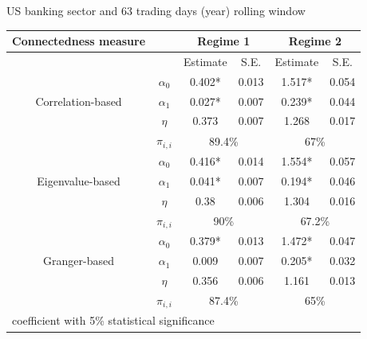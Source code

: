 \documentclass{beamer}
\begin{document}
\begin{frame}
    US banking sector and 63 trading days (year) rolling window
    \begin{table}\small
        \begin{tabular}{cccccc}
          \toprule
           Connectedness measure &  & \multicolumn{2}{c}{\bfseries Regime 1} & \multicolumn{2}{c}{\bfseries Regime 2}  \\
           \hline
           & & Estimate & S.E. & Estimate & S.E. \\
           \hline
           \multirow{3}{*}[\normalbaselineskip]{Correlation-based} & $\alpha_0$ & 0.402* & 0.013 & 1.517*  & 0.054 \\
            & $\alpha_1$ & 0.027* & 0.007 & 0.239* & 0.044 \\
            & $\eta$ & 0.373 & 0.007 & 1.268 & 0.017 \\
            & $\pi_{i,i}$ &  \multicolumn{2}{c}{89.4\%} & \multicolumn{2}{c}{67\%}\\
            \hline
            \multirow{3}{*}[\normalbaselineskip]{Eigenvalue-based} & $\alpha_0$ & 0.416* & 0.014 & 1.554*  & 0.057 \\
            & $\alpha_1$ & 0.041* & 0.007 & 0.194* & 0.046 \\
            & $\eta$ & 0.38 & 0.006 & 1.304 & 0.016 \\
            & $\pi_{i,i}$ &  \multicolumn{2}{c}{90\%} & \multicolumn{2}{c}{67.2\%}\\
            \hline
            \multirow{3}{*}[\normalbaselineskip]{Granger-based} & $\alpha_0$ & 0.379* & 0.013 & 1.472*  & 0.047 \\
            & $\alpha_1$ & 0.009 & 0.007 & 0.205* & 0.032 \\
            & $\eta$ & 0.356 & 0.006 & 1.161 & 0.013 \\
            & $\pi_{i,i}$ &  \multicolumn{2}{c}{87.4\%} & \multicolumn{2}{c}{65\%}\\
            \hline
          \multicolumn{6}{l}{\footnotesize * coefficient with 5\% statistical significance} \\
          \hline
        \end{tabular}
      \end{table}

\end{frame}    
\end{document}

